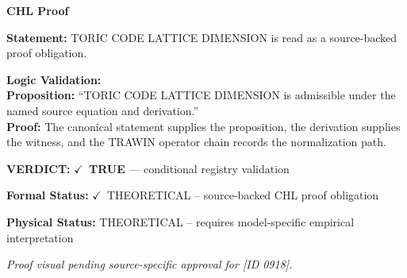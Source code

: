 \vspace{0.45em}
\noindent\textbf{CHL Proof}\par
\textbf{Statement:} TORIC CODE LATTICE DIMENSION is read as a source-backed proof obligation.

\textbf{Logic Validation:}\\
\textbf{Proposition:} ``TORIC CODE LATTICE DIMENSION is admissible under the named source equation and derivation.''\\
\textbf{Proof:} The canonical statement supplies the proposition, the derivation supplies the witness, and the TRAWIN operator chain records the normalization path.

\textbf{VERDICT:} \ensuremath{\checkmark}\ \textbf{TRUE} --- conditional registry validation

\textbf{Formal Status:} \ensuremath{\checkmark}\ THEORETICAL -- source-backed CHL proof obligation

\textbf{Physical Status:} THEORETICAL -- requires model-specific empirical interpretation
\par\vspace{0.45em}
\par
\vfill
\begingroup\footnotesize\itshape
Proof visual pending source-specific approval for [ID 0918].
\par\endgroup
\vfill
\endgroup
\endgroup
